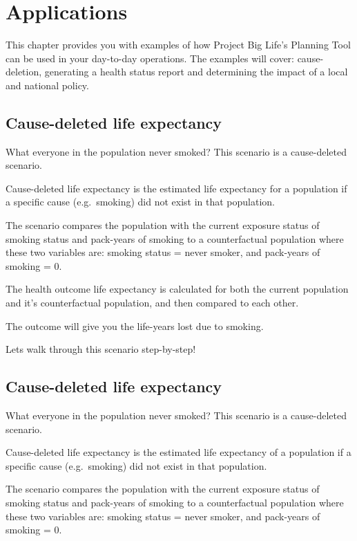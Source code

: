 \documentclass[]{book}
\begin{document}
\chapter{Applications}\label{applications}

This chapter provides you with examples of how Project Big Life's
Planning Tool can be used in your day-to-day operations. The examples
will cover: cause-deletion, generating a health status report and
determining the impact of a local and national policy.

\section{Cause-deleted life
expectancy}\label{cause-deleted-life-expectancy}

What everyone in the population never smoked? This scenario is a
cause-deleted scenario.

Cause-deleted life expectancy is the estimated life
expectancy for a population if a specific cause (e.g.~smoking) did not
exist in that population.

The scenario compares the population with the current exposure status of
smoking status and pack-years of smoking to a counterfactual population
where these two variables are: smoking status = never smoker, and
pack-years of smoking = 0.

The health outcome life expectancy is calculated for both the current
population and it's counterfactual population, and then compared to each
other.

The outcome will give you the life-years lost due to smoking.

Lets walk through this scenario step-by-step!

\section{Cause-deleted life
expectancy}\label{cause-deleted-life-expectancy}

What everyone in the population never smoked? This scenario is a
cause-deleted scenario.

Cause-deleted life expectancy is the estimated life
expectancy of a population if a specific cause (e.g.~smoking) did not
exist in that population.

The scenario compares the population with the current exposure status of
smoking status and pack-years of smoking to a counterfactual population
where these two variables are: smoking status = never smoker, and
pack-years of smoking = 0.
\end{document}
